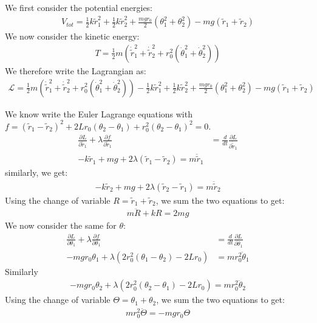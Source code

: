 \documentclass{article}
\begin{document}
\subsubsection{} %

We first consider the potential energies:
\begin{align*}
	V_{tot} = \frac{1}{2}k\tilde{r}_1^2 + \frac{1}{2}k\tilde{r}_2^2 + \frac{mgr_0}{2}(\theta_1^2 + \theta^2_2) - mg(\tilde{r}_1 + \tilde{r}_2)
\end{align*}
We now consider the kinetic energy:
\begin{align*}
	T = \frac{1}{2}m(\dot{\tilde{r}}_1^2 + \dot{\tilde{r}}_2^2 + r_0^2(\dot{\theta}_1^2 + \dot{\theta}_2^2))
\end{align*}
We therefore write the Lagrangian as:
\begin{align*}
	\mathcal{L} = \frac{1}{2}m(\dot{\tilde{r}}_1^2 + \dot{\tilde{r}}_2^2 + r_0^2(\dot{\theta}_1^2 + \dot{\theta}_2^2)) - \frac{1}{2}k\tilde{r}_1^2 + \frac{1}{2}k\tilde{r}_2^2 + \frac{mgr_0}{2}(\theta_1^2 + \theta^2_2) - mg(\tilde{r}_1 + \tilde{r}_2)
\end{align*}

We know write the Euler Lagrange equations with $f =  (\tilde{r}_1 -\tilde{r}_2)^2 + 2Lr_0(\theta_2 - \theta_1) + r_0^2(\theta_2 - \theta_1)^2 = 0$.
\begin{align*}
	\frac{\partial L}{\partial \tilde{r}_1} + \lambda\frac{\partial f}{\partial \tilde{r}_1} &= \frac{d}{dt}\frac{\partial L}{\partial \dot{\tilde{r}}_1}\\
	-k\tilde{r}_1 + mg + 2\lambda(\tilde{r}_1 - \tilde{r}_2) = m\ddot{\tilde{r}}_1
\end{align*}
similarly, we get:
\begin{align*}
	-k\tilde{r}_2 + mg + 2\lambda(\tilde{r}_2 - \tilde{r}_1) = m\ddot{\tilde{r}}_2
\end{align*}
Using the change of variable $R = \tilde{r}_1 + \tilde{r}_2$, we sum the two equations to get:
\begin{align*}
	m\ddot{R} + kR = 2mg
\end{align*}
We now consider the same for $\theta$:
\begin{align*}
	\frac{\partial L}{\partial \theta_1} + \lambda\frac{\partial f}{\partial \theta_1} &= \frac{d}{dt}\frac{\partial L}{\partial \dot{\theta}_1}\\
	-mgr_0\theta_1 + \lambda(2r_0^2(\theta_1 - \theta_2) - 2Lr_0) &= mr_0^2\ddot{\theta}_1
\end{align*}
Similarly
\begin{align*}
	-mgr_0\theta_2 + \lambda(2r_0^2(\theta_2 - \theta_1) - 2Lr_0) = mr_0^2\ddot{\theta}_2
\end{align*}
Using the change of variable $\Theta = \theta_1 + \theta_2$, we sum the two equations to get:
\begin{align*}
	mr_0^2\ddot{\Theta} = -mgr_0\Theta
\end{align*}
\end{document}
